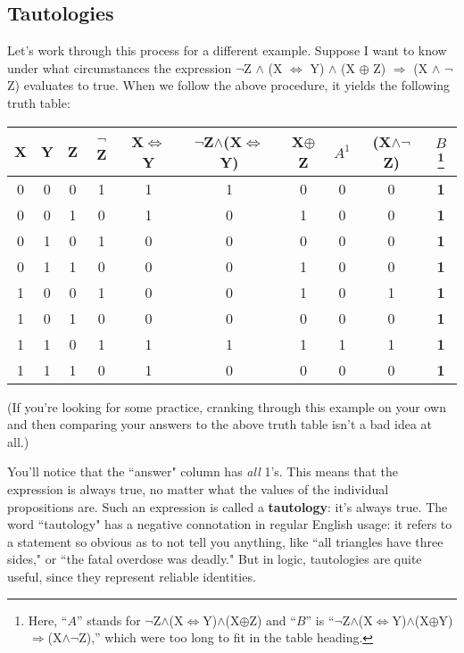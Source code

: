 \subsection{Tautologies}

Let's work through this process for a different example. Suppose I want to
know under what circumstances the expression $\neg$Z $\wedge$ (X
$\Leftrightarrow$ Y) $\wedge$ (X $\oplus$ Z) $\Rightarrow$ (X $\wedge$
$\neg$ Z) evaluates to true. When we follow the above procedure, it yields
the following truth table:
\begin{nobreak}
\begin{center}
\begin{tabular}{c c c|c c c c c c c}
\footnotesize
X & Y & Z & $\neg$Z & X$\Leftrightarrow$Y &
$\neg$Z$\wedge$(X$\Leftrightarrow$Y) & X$\oplus$Z &
$A^\textrm{1}$ &
(X$\wedge\neg$Z) &
$B$\footnote{Here, ``$A$'' stands for
$\neg$Z$\wedge$(X$\Leftrightarrow$Y)$\wedge$(X$\oplus$Z) 
and ``$B$'' is
``$\neg$Z$\wedge$(X$\Leftrightarrow$Y)$\wedge$(X$\oplus$Y)$\Rightarrow$(X$\wedge\neg$Z),'' which were too long to fit in the table heading.} \\
\hline
0 & 0 & 0 & 1 & 1 & 1 & 0 & 0 & 0 & \textbf{1} \\
0 & 0 & 1 & 0 & 1 & 0 & 1 & 0 & 0 & \textbf{1} \\
0 & 1 & 0 & 1 & 0 & 0 & 0 & 0 & 0 & \textbf{1} \\
0 & 1 & 1 & 0 & 0 & 0 & 1 & 0 & 0 & \textbf{1} \\
1 & 0 & 0 & 1 & 0 & 0 & 1 & 0 & 1 & \textbf{1} \\
1 & 0 & 1 & 0 & 0 & 0 & 0 & 0 & 0 & \textbf{1} \\
1 & 1 & 0 & 1 & 1 & 1 & 1 & 1 & 1 & \textbf{1} \\
1 & 1 & 1 & 0 & 1 & 0 & 0 & 0 & 0 & \textbf{1} \\
\end{tabular}
\end{center}
\end{nobreak}
\normalsize

(If you're looking for some practice, cranking through this example on your
own and then comparing your answers to the above truth table isn't a bad
idea at all.)

You'll notice that the ``answer" column has \textit{all} 1's. This means
that the expression is always true, no matter what the values of the
individual propositions are. Such an expression is called a
\textbf{tautology}: it's always true. The word ``tautology" has a 
negative connotation in regular English usage: it refers to a statement so
obvious as to not tell you anything, like ``all triangles have three
sides," or ``the fatal overdose was deadly." But in logic, tautologies are
quite useful, since they represent reliable identities.

